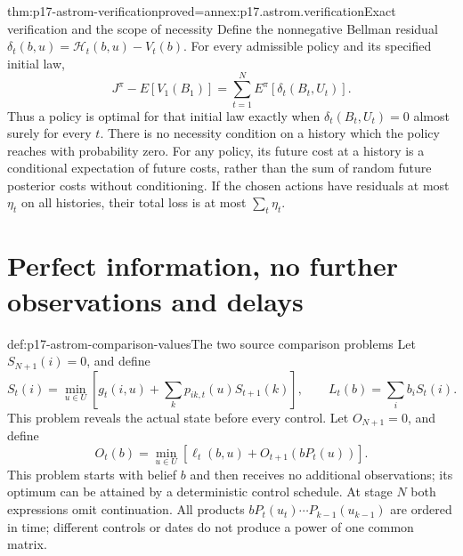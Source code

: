 \begin{hbtheorem}{thm:p17-astrom-verification}{proved=annex:p17.astrom.verification}{Exact verification and the scope of necessity}
Define the nonnegative Bellman residual
\(\delta_t(b,u)=\mathcal H_t(b,u)-V_t(b)\).
For every admissible policy and its specified initial law,
\[
 J^\pi-E[V_1(B_1)]
                  =\sum_{t=1}^N E^\pi[\delta_t(B_t,U_t)].
\]
Thus a policy is optimal for that initial law exactly when
\(\delta_t(B_t,U_t)=0\) almost surely for every \(t\).
There is no necessity condition on a history which the policy
reaches with probability zero.
For any policy, its future cost at a history is a conditional
expectation of future costs, rather than the sum of random
future posterior costs without conditioning.
If the chosen actions have residuals at most \(\eta_t\)
on all histories, their total loss is at most \(\sum_t\eta_t\).
\end{hbtheorem}

\section{Perfect information, no further observations and delays}

\begin{hbdefinition}{def:p17-astrom-comparison-values}{The two source comparison problems}
Let \(S_{N+1}(i)=0\), and define
\[
 S_t(i)=\min_{u\in U}
          [g_t(i,u)+\sum_k p_{ik,t}(u)S_{t+1}(k)],
 \qquad L_t(b)=\sum_i b_iS_t(i).
\]
This problem reveals the actual state before every control.
Let \(O_{N+1}=0\), and define
\[
 O_t(b)=\min_{u\in U}
                  [\ell_t(b,u)+O_{t+1}(bP_t(u))].
\]
This problem starts with belief \(b\) and then receives no
additional observations; its optimum can be attained by a
deterministic control schedule.
At stage \(N\) both expressions omit continuation.
All products \(bP_t(u_t)\cdots P_{k-1}(u_{k-1})\) are ordered
in time; different controls or dates do not produce a power
of one common matrix.
\end{hbdefinition}

